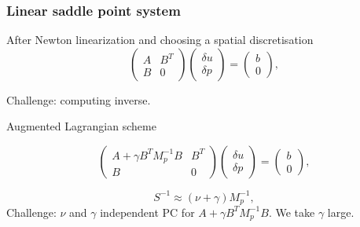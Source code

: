 \documentclass[presentation]{beamer}
\begin{document}
\begin{frame}
  \frametitle{Linear saddle point system}
  After Newton linearization and choosing a spatial discretisation
\begin{equation} \label{eqn:sp}
\begin{pmatrix}
A & B^T \\
B & 0
\end{pmatrix}
\begin{pmatrix}
\delta u \\ \delta p
\end{pmatrix}
=
\begin{pmatrix}
b \\ 0
\end{pmatrix},
\end{equation}

Challenge: computing inverse.

Augmented Lagrangian scheme

\begin{equation} \label{eqn:spal}
\begin{pmatrix}
A + \gamma B^T M_p^{-1} B & B^T \\
B & 0
\end{pmatrix}
\begin{pmatrix}
\delta u \\ \delta p
\end{pmatrix}
=
\begin{pmatrix}
b \\ 0
\end{pmatrix},
\end{equation}

\begin{equation} \label{eqn:schur}
S^{-1} \approx (\nu + \gamma) M_p^{-1},
\end{equation}
Challenge: $\nu$ and $\gamma$ independent PC for $A + \gamma B^T
M_p^{-1} B$.  We take $\gamma$ large.
\end{frame}
\end{document}
